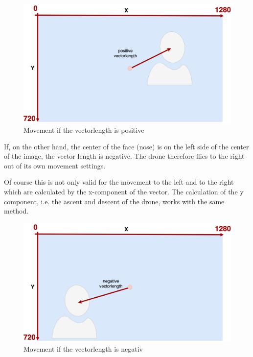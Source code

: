 \documentclass[a4paper,11pt,singlespacing]{article}
\begin{document}
\begin{figure}[H]
	\centering
	\includegraphics[width=\textwidth]{images/positive_vector_length.png}
	\caption{Movement if the vectorlength is positive}
	\label{positive_vectortlength}
\end{figure}

If, on the other hand, the center of the face (nose) is on the left side of the center of the image, the vector length is negative.
The drone therefore flies to the right out of its own movement settings.

Of course this is not only valid for the movement to the left and to the right which are calculated by the x-component of the vector.
The calculation of the y component, i.e. the ascent and descent of the drone, works with the same method.

\begin{figure}[H]
	\centering
	\includegraphics[width=\textwidth]{images/negative_vector_length.png}
	\caption{Movement if the vectorlength is negativ}
	\label{negativ_vectortlength}
\end{figure}
\end{document}
